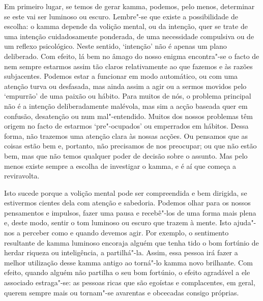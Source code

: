 Em primeiro lugar, se temos de gerar kamma, podemos, pelo menos, determinar se
este vai ser luminoso ou escuro. Lembre"-se que existe a possibilidade de
escolha: o kamma depende da volição mental, ou da intenção, quer se trate de uma
intenção cuidadosamente ponderada, de uma necessidade compulsiva ou de um
reflexo psicológico. Neste sentido, `intenção' não é apenas um plano deliberado.
Com efeito, lá bem no âmago do nosso enigma encontra"-se o facto de nem sempre
estarmos assim tão claros relativamente ao que fazemos e às razões subjacentes.
Podemos estar a funcionar em modo automático, ou com uma atenção turva ou
desfasada, mas ainda assim a agir ou a sermos movidos pelo `empurrão' de uma
paixão ou hábito. Para muitos de nós, o problema principal não é a intenção
deliberadamente malévola, mas sim a acção baseada quer em confusão, desatenção
ou num mal"-entendido. Muitos dos nossos problemas têm origem no facto de
estarmos `pre"-ocupados' ou emperrados em hábitos. Dessa forma, não trazemos uma
atenção clara às nossas acções. Ou pensamos que as coisas estão bem e, portanto,
não precisamos de nos preocupar; ou que não estão bem, mas que não temos
qualquer poder de decisão sobre o assunto. Mas pelo menos existe sempre a
escolha de investigar o kamma, e é aí que começa a reviravolta.

Isto sucede porque a volição mental pode ser compreendida e bem dirigida, se
estivermos cientes dela com atenção e sabedoria. Podemos olhar para os nossos
pensamentos e impulsos, fazer uma pausa e recebê"-los de uma forma mais plena e,
deste modo, sentir o tom luminoso ou escuro que trazem à mente. Isto ajuda"-nos a
perceber como e quando devemos agir. Por exemplo, o sentimento resultante de
kamma luminoso encoraja alguém que tenha tido o bom fortúnio de herdar riqueza
ou inteligência, a partilhá"-la. Assim, essa pessoa irá fazer a melhor utilização
desse kamma antigo ao torná"-lo kamma novo brilhante. Com efeito, quando alguém
não partilha o seu bom fortúnio, o efeito agradável a ele associado estraga"-se:
as pessoas ricas que são egoístas e complacentes, em geral, querem sempre mais
ou tornam"-se avarentas e obcecadas consigo próprias.

